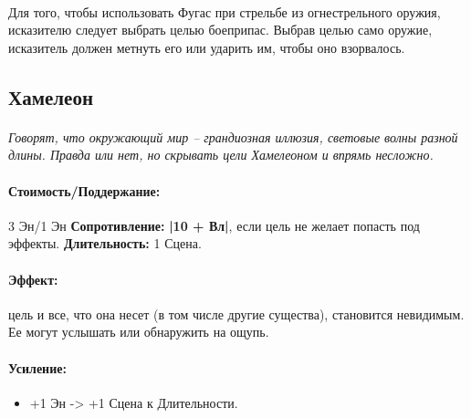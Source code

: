 \paragraph{}
\begin{tcolorbox} Для того, чтобы использовать Фугас при стрельбе из огнестрельного оружия, исказителю следует выбрать целью боеприпас. Выбрав целью само оружие, исказитель должен метнуть его или ударить им, чтобы оно взорвалось. 
\end{tcolorbox}
\subsection{Хамелеон}
\paragraph{} 
\textit{Говорят, что окружающий мир – грандиозная иллюзия, световые волны разной длины. Правда или нет, но скрывать цели Хамелеоном и впрямь несложно.}
\paragraph{Стоимость/Поддержание: }3 Эн/1 Эн
\newline
\textbf{Сопротивление: }
\textbf{|10 + Вл|}, если цель не желает попасть под эффекты.
\newline 
\textbf{Длительность: }1 Сцена.
\paragraph{Эффект: }цель и все, что она несет (в том числе другие существа), становится невидимым. Ее могут услышать или обнаружить на ощупь.
\paragraph{Усиление:}
\begin{itemize}
\item+1 Эн -> +1 Сцена к Длительности.
\end{itemize}

